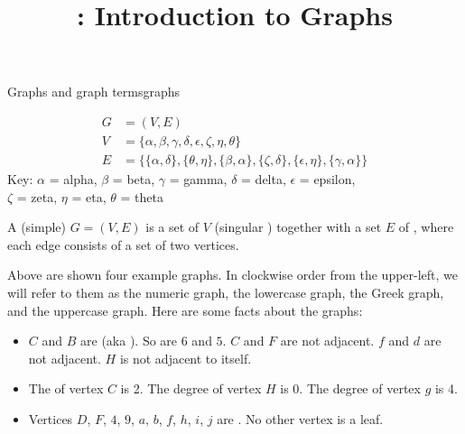 \documentclass{tufte-handout}
\title{\thecourse: Introduction to Graphs}
\date{}
\begin{document}
\maketitle

\begin{model}{Graphs and graph terms}{graphs}
  \begin{center}
  \begin{minipage}{0.45\textwidth}
    
  \end{minipage}
  \begin{minipage}{0.45\textwidth}
    
  \end{minipage}

  \vspace{1em}
  \begin{minipage}{0.45\textwidth}
    
  \end{minipage}
  \begin{minipage}{0.45\textwidth}
    \begin{align*}
      G &= (V,E) \\
      V &= \{\alpha, \beta, \gamma, \delta, \epsilon, \zeta, \eta,
          \theta\} \\
      E &= \{\{\alpha, \delta\}, \{\theta, \eta\}, \{\beta, \alpha\},
          \{\zeta, \delta\}, \{\epsilon, \eta\}, \{\gamma, \alpha\}\}
    \end{align*}
    {\scriptsize
      Key: $\alpha$ = alpha, $\beta$ = beta, $\gamma$ = gamma, $\delta$ =
      delta, $\epsilon$ = epsilon, \\ $\zeta$ = zeta, $\eta$ = eta,
      $\theta$ = theta
    }
  \end{minipage}
  \end{center}

  \vspace{1em}
  \begin{defn}
    A (simple)  $G = (V,E)$ is a set of 
    $V$ (singular ) together with a set $E$ of
    , where each edge consists of a set of two vertices.
  \end{defn}

  Above are shown four example graphs.  In clockwise order from the
  upper-left, we will refer to them as the numeric graph, the
  lowercase graph, the Greek graph, and the uppercase graph.  Here are
  some facts about the graphs:

  \begin{itemize}
  \item $C$ and $B$ are  (aka ).  So
    are $6$ and $5$.  $C$ and $F$ are not adjacent.  $f$ and $d$ are
    not adjacent.  $H$ is not adjacent to itself.
  \item The  of vertex $C$ is 2.  The degree of vertex $H$ is
    0.  The degree of vertex $g$ is 4.
  \item Vertices $D$, $F$, $4$, $9$, $a$, $b$, $f$, $h$, $i$, $j$ are
    .  No other vertex is a leaf.
  \end{itemize}
\end{model}
\end{document}
